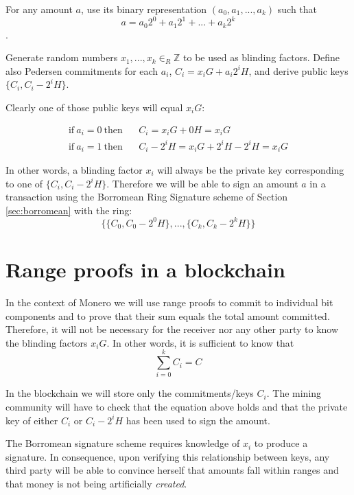 For any amount \(a\), use its binary representation \((a_0, a_1, ..., a_k)\) such that 
\[a = a_0 2^0 + a_1 2^1 + ... + a_k 2^k  \].

Generate random numbers \(x_1, ..., x_k \in_R \mathbb{Z}\) to be used as blinding factors. 
Define also Pedersen commitments for each \(a_i\), \(C_ i = x_i G + a_i 2^i H\),  and derive public keys \(\{C_i, C_i - 2^i H\}\). 

Clearly one of those public keys will equal \(x_i G\):

\begin{align*}
\textrm{if}\ a_i = 0 \ \textrm{then}\ \ \ &  \ C_i = x_i G + 0 H = x_i G \\
\textrm{if}\ a_i = 1 \ \textrm{then}\ \ \ & \ C_i - 2^i H = x_i G + 2^i H  - 2^i H = x_i G 
\end{align*}

In other words, a blinding factor \(x_i\) will always be the private key corresponding to one of \(\{C_i, C_i - 2^i H\}\).
Therefore we will be able to sign an amount \(a\) in a transaction using the Borromean Ring Signature scheme of 
Section \ref{sec:borromean} with the ring:
\[\{ \{C_0, C_0 - 2^0 H\}, ..., \{C_k, C_k - 2^k H\}  \}\]



\section{Range proofs in a blockchain} 

In the context of Monero we will use range proofs to
commit to individual bit components and to prove that their sum equals the total amount committed. 
Therefore, it will not be necessary for
the receiver nor any other party to know the blinding factors \(x_i G\).
In other words, it is sufficient to know that
\[\sum^k_{i=0} C_i = C  \]

In the blockchain we will store only the commitments/keys \(C_i\). The mining community will have to check that
the equation above holds and that the private key of either \(C_i\) or \(C_i - 2^i H\) has been used to sign the amount.

The Borromean signature scheme requires knowledge of \(x_i\) to produce a signature.
In consequence, upon verifying this relationship between keys, any third party will
be able to convince herself that amounts fall within ranges and that money is not being artificially {\em created}.

